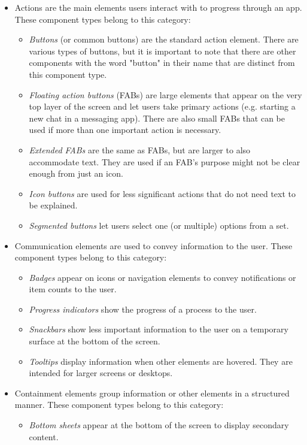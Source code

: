 \documentclass[11pt,titlepage,oneside,openany]{book}
\begin{document}
\begin{itemize}
	\item Actions are the main elements users interact with to progress through an app. These component types belong to this category:
	\begin{itemize}
		\item \emph{Buttons} (or common buttons) are the standard action element. There are various types of buttons, but it is important to note that there are other components with the word "button" in their name that are distinct from this component type.
		\item \emph{Floating action buttons} (FABs) are large elements that appear on the very top layer of the screen and let users take primary actions (e.g. starting a new chat in a messaging app). There are also small FABs that can be used if more than one important action is necessary.
		\item \emph{Extended FABs} are the same as FABs, but are larger to also accommodate text. They are used if an FAB's purpose might not be clear enough from just an icon.
		\item \emph{Icon buttons} are used for less significant actions that do not need text to be explained.
		\item \emph{Segmented buttons} let users select one (or multiple) options from a set.
	\end{itemize}
	\item Communication elements are used to convey information to the user. These component types belong to this category:
	\begin{itemize}
		\item \emph{Badges} appear on icons or navigation elements to convey notifications or item counts to the user.
		\item \emph{Progress indicators} show the progress of a process to the user.
		\item \emph{Snackbars} show less important information to the user on a temporary surface at the bottom of the screen.
		\item \emph{Tooltips} display information when other elements are hovered. They are intended for larger screens or desktops.
	\end{itemize}
	\item Containment elements group information or other elements in a structured manner. These component types belong to this category:
	\begin{itemize}
		\item \emph{Bottom sheets} appear at the bottom of the screen to display secondary content.

\end{itemize}
\end{itemize}
\end{document}
